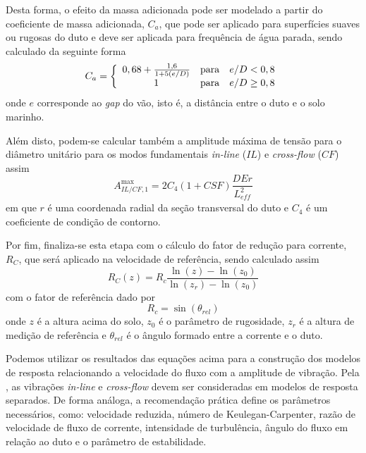 Desta forma, o efeito da massa adicionada pode ser modelado a partir do coeficiente de massa adicionada, $C_a$, que pode ser aplicado para superfícies suaves ou rugosas do duto e deve ser aplicada para frequência de água parada, sendo calculado da seguinte forma
\begin{equation}
\label{eq:jdsn-Ca}
C_a = \left\{
\begin{array}{c c l}
	0,68 + \frac{1,6}{1 + 5 (e/D)} & \mathrm{para} & e/D < 0,8 \\
	1                              & \mathrm{para} & e/D \geq 0,8
\end{array}
\right.
\end{equation}
onde $e$ corresponde ao \textit{gap} do vão, isto é, a distância entre o duto e o solo marinho.

Além disto, podem-se calcular também a amplitude máxima de tensão para o diâmetro unitário para os modos fundamentais \textit{in-line} ($\mathit{IL}$) e \textit{cross-flow} ($\mathit{CF}$) assim
\begin{equation}
\label{eq:jdsn-Ailcf}
A_{\mathit{IL}/\mathit{CF}, 1}^\mathrm{max} = 2 C_4(1 + \mathit{CSF})\frac{D E r}{L_\mathit{eff}^2}
\end{equation}
em que $r$ é uma coordenada radial da seção transversal do duto e $C_4$ é um coeficiente de condição de contorno.


Por fim, finaliza-se esta etapa com o cálculo do fator de redução para corrente, $R_C$, que será aplicado na velocidade de referência, sendo calculado assim
\begin{equation}
\label{eq:jdsn-R_C}
R_C(z) = R_c \frac{\ln(z)-\ln(z_0)}{\ln(z_r)-\ln(z_0)}
\end{equation}
com o fator de referência dado por
\begin{equation}
\nonumber
R_c = \sin(\theta_\mathit{rel})
\end{equation}
onde $z$ é a altura acima do solo, $z_0$ é o parâmetro de rugosidade, $z_r$ é a altura de medição de referência e $\theta_\mathit{rel}$ é o ângulo formado entre a corrente e o duto.

Podemos utilizar os resultados das equações acima para a construção dos modelos de resposta relacionando a velocidade do fluxo com a amplitude de vibração.
Pela , as vibrações \textit{in-line} e \textit{cross-flow} devem ser consideradas em modelos de resposta separados.
De forma análoga, a recomendação prática define os parâmetros necessários, como: velocidade reduzida, número de Keulegan-Carpenter, razão de velocidade de fluxo de corrente, intensidade de turbulência, ângulo do fluxo em relação ao duto e o parâmetro de estabilidade.

